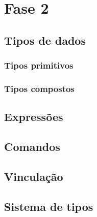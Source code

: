 \documentclass[a4 paper, 12pt]{article}
\begin{document}
\section{Fase 2}
\subsection{Tipos de dados}
\subsubsection{Tipos primitivos}

\subsubsection{Tipos compostos}

\subsection{Express\~oes}

\subsection{Comandos}

\subsection{Vincula\c c\~ao}

\subsection{Sistema de tipos}
\end{document}
